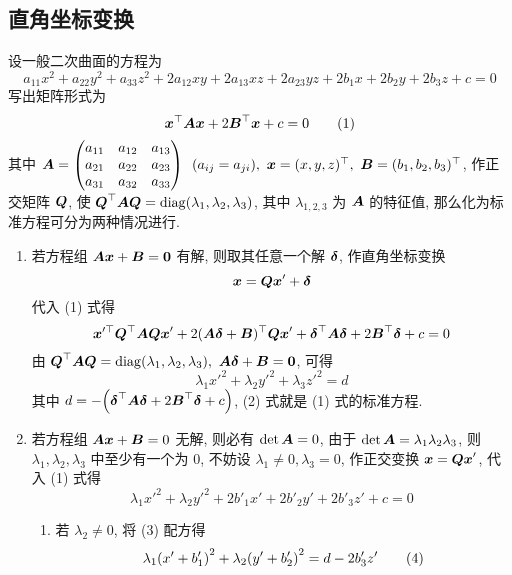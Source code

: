 \subsection{直角坐标变换}

设一般二次曲面的方程为
$$a_{11}x^2+a_{22}y^2+a_{33}z^2+2a_{12}xy+2a_{13}xz+2a_{23}yz+2b_1x+2b_2y+2b_3z+c=0$$
写出矩阵形式为
\begin{equation*}
    \vb*{x}^\top\vb*{Ax}+2\vb*{B}^\top\vb*{x}+c=0
    \tag{1}
\end{equation*}
其中 $\vb*{A}=\mqty(\xmat*{a}{3}{3})~~(a_{ij}=a_{ji}),~\vb*{x}=(x,y,z)^\top,~\vb*{B}=(b_1,b_2,b_3)^\top$, 
作正交矩阵 $\vb*{Q}$, 使 $\vb*{Q}^\top\vb*{AQ}=\mathrm{diag}(\lambda_1,\lambda_2,\lambda_3)$, 其中 $\lambda_{1,2,3}$ 为 $\vb*{A}$ 的特征值, 那么化为标准方程可分为两种情况进行.
\begin{enumerate}[label=(\arabic{*})]
    \item 若方程组 $\vb*{Ax}+\vb*{B}=\vb*{0}$ 有解, 则取其任意一个解 $\vb*{\delta}$, 作直角坐标变换 $$\vb*{x}=\vb*{Qx}'+\vb*{\delta}$$ 代入 (1) 式得
          $$\vb*{x}'^\top\vb*{Q}^\top\vb*{AQx}'+2(\vb*{A\delta}+\vb*{B})^\top\vb*{Qx}'+\vb*{\delta}^\top\vb*{A\delta}+2\vb*{B}^\top\vb*{\delta}+c=0$$
          由 $\vb*{Q}^\top\vb*{AQ}=\mathrm{diag}(\lambda_1,\lambda_2,\lambda_3),~\vb*{A\delta}+\vb*{B}=\vb*{0}$, 可得
          \begin{equation*}
              \lambda_1 x'^2+\lambda_2 y'^2+\lambda_3 z'^2=d
              \tag{2}
          \end{equation*}
          其中 $d=-\qty(\vb*{\delta}^\top\vb*{A\delta}+2\vb*{B}^\top\vb*{\delta}+c)$, (2) 式就是 (1) 式的标准方程.
    \item 若方程组 $\vb*{Ax}+\vb*{B}=0$ 无解, 则必有 $\det\vb*{A}=0$, 由于 $\det\vb*{A}=\lambda_1\lambda_2\lambda_3$, 则 $\lambda_1,\lambda_2,\lambda_3$ 中至少有一个为 0, 不妨设 $\lambda_1\neq 0,\lambda_3=0$, 作正交变换 $\vb*{x}=\vb*{Qx}'$, 代入 (1) 式得
          \begin{equation*}
              \lambda_1x'^2+\lambda_2y'^2+2b'_1x'+2b'_2y'+2b'_3z'+c=0
              \tag{3}
          \end{equation*}
          \begin{enumerate}[label=(\roman{*})]
              \item 若 $\lambda_2\neq0$, 将 (3) 配方得
                    \begin{equation*}
                        \lambda_1\qty(x'+b_1')^2+\lambda_2\qty(y'+b_2')^2=d-2b_3'z'
                        \tag{4}
                    \end{equation*}

\end{enumerate}
\end{enumerate}
